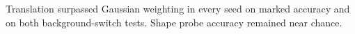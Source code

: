 Translation surpassed Gaussian weighting in every seed on marked accuracy and on both background-switch tests. Shape probe accuracy remained near chance.
